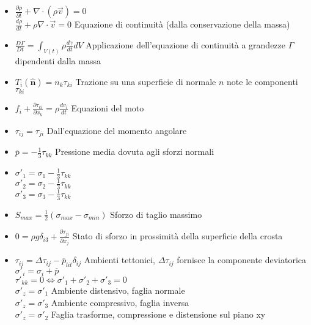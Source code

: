 \documentclass[a4paper]{article}
\begin{document}
\begin{itemize}
	\item $\frac{\partial \rho}{\partial t} + \nabla \cdot (\rho \overrightarrow{v}) = 0$ \\
	$\frac{d \rho}{d t} + \rho \nabla \cdot \overrightarrow{v} = 0$  \hspace{0.3cm} Equazione di continuità (dalla conservazione della massa)
	
	\item $\frac{D \Gamma}{Dt}= \int_{V(t)} \rho \frac{d \gamma}{dt} dV $ Applicazione dell'equazione di continuità a grandezze $ \Gamma$ dipendenti dalla massa
	
	\item $T_i(\hat{\textbf{n}})=n_k \tau_{ki}$ Trazione su una superficie di normale $n$ note le componenti $\tau_{ki}$
	
	\item $f_i + \frac{\partial \tau_{ki}}{\partial x_k} = \rho \frac{dv_i}{dt}$ Equazioni del moto
	
	\item $\tau_{ij} = \tau_{ji}$ Dall'equazione del momento angolare
	
	\item $\overline{p}=-\frac{1}{3}\tau_{kk}$ Pressione media dovuta agli sforzi normali
	
	\item $\sigma'_1=\sigma_1-\frac{1}{3}\tau_{kk}$\\
	$\sigma'_2=\sigma_2-\frac{1}{3}\tau_{kk}$\\
	$\sigma'_3=\sigma_3-\frac{1}{3}\tau_{kk}$\\
	
	\item $S_{max}=\frac{1}{2}(\sigma_{max}-\sigma_{min})$ Sforzo di taglio massimo
	
	\item $0=\rho g \delta_{i3}+ \frac{\partial \tau_{ji}}{\partial x_j}$ Stato di sforzo in prossimità della superficie della crosta
	
	\item $\tau_{ij} = \Delta \tau_{ij}-\overline{p}_{lit} \delta_{ij}$ Ambienti tettonici, $\Delta \tau_{ij}$ fornisce la componente deviatorica\\
	$\sigma'_i=\sigma_i+\overline{p}$\\
	$\tau'_{kk}=0 \iff \sigma'_1 + \sigma'_2 +\sigma'_3 =0$\\
	$\sigma'_z=\sigma'_1$ Ambiente distensivo, faglia normale\\
	$\sigma'_z=\sigma'_3$ Ambiente compressivo, faglia inversa\\
	$\sigma'_z=\sigma'_2$ Faglia trasforme, compressione e distensione sul piano xy\\
	

\end{itemize}
\end{document}
